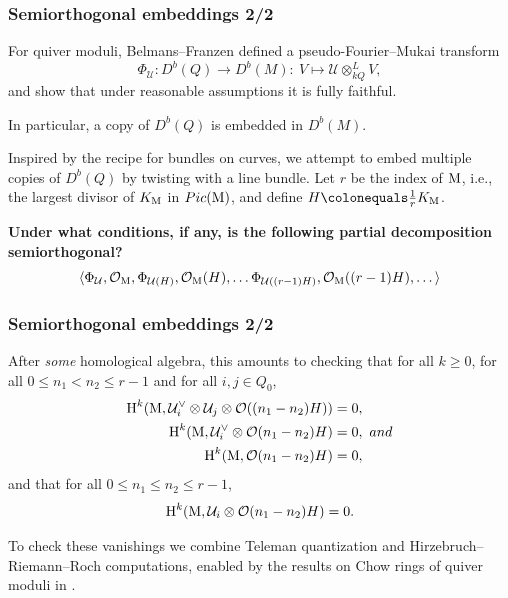 \documentclass{beamer}
\begin{document}
\begin{frame}
    \frametitle{Semiorthogonal embeddings 2/2}
For quiver moduli, Belmans--Franzen \cite{vector-fields-paper}
defined a pseudo-Fourier--Mukai transform
\[\Phi_{\mathcal{U}} : D^b(Q) \to D^b(M) :~V \mapsto \mathcal{U} \otimes_{k Q}^{L} V, \]
and show that under reasonable assumptions it is fully faithful.

In particular, a copy of $D^b(Q)$ is embedded in $D^b(M)$. \pause

Inspired by the recipe for bundles on curves, we attempt to embed
multiple copies of $D^b(Q)$ by twisting with a line bundle. \pause
\vfill
Let $r$ be the index of $\operatorname{M}$, i.e.,
the largest divisor of $K_{\operatorname{M}}$ in $Pic(\operatorname{M})$, and
define $H \colonequals \frac{1}{r}K_{\modulispace}$. \pause

\textbf{Under what conditions, if any, is the following partial decomposition semiorthogonal?}
\[
    \langle
    \Phi_{\mathcal{U}}, \mathcal{O}_{\operatorname{M}},
    \Phi_{\mathcal{U}(H)}, \mathcal{O}_{\operatorname{M}}(H), \dots
    \Phi_{\mathcal{U}((r-1)H)}, \mathcal{O}_{\operatorname{M}}((r-1)H), \dots
    \rangle
\]
\end{frame}

\begin{frame}
    \frametitle{Semiorthogonal embeddings 2/2}

After \emph{some} homological algebra, this amounts to checking that for all $k \geq 0$,
for all $0 \leq n_1 < n_2 \leq r-1$ and for all $i,j \in Q_0$,
\begin{align}
    \operatorname{H}^k(\operatorname{M}, \mathcal{U}^\vee_i \otimes \mathcal{U}_j \otimes \mathcal{O}((n_1 - n_2)H)) &= 0, \label{equation:needed-UidualUjH}\\
    \operatorname{H}^k(\operatorname{M}, \mathcal{U}^\vee_i \otimes \mathcal{O}(n_1 - n_2)H) &= 0,\ and \label{equation:needed-UidualH}\\
    \operatorname{H}^k(\operatorname{M}, \mathcal{O}(n_1 - n_2)H) &= 0, \label{equation:needed-H}
\end{align}
and that for all $0 \leq n_1 \leq n_2 \leq r-1$,
\begin{equation}
    \operatorname{H}^k(\operatorname{M}, \mathcal{U}_i \otimes \mathcal{O}(n_1 - n_2)H) = 0. \label{equation:needed-UiH}
\end{equation} \pause

To check these vanishings we combine Teleman quantization
and Hirzebruch--Riemann--Roch computations, enabled by the results
on Chow rings of quiver moduli in \cite{MR3318266,chow-paper}.
\end{frame}
\end{document}
